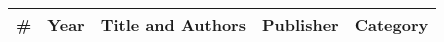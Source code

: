
\begin{longtable}{lcp{7.75cm}>{\raggedright}p{5.25cm}p{1.75cm}}
\# & Year & Title and Authors & Publisher & Category\\
\hline 
\endhead 
\end{longtable}
